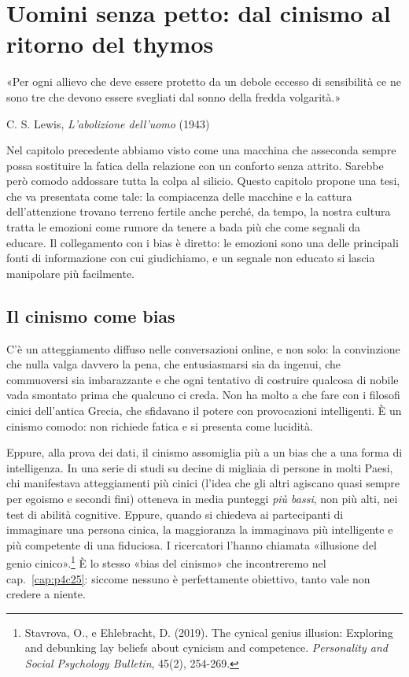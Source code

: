 
\chapter{Uomini senza petto: dal cinismo al ritorno del thymos}
\label{cap:p3c24}

\epigraph{«Per ogni allievo che deve essere protetto da un debole eccesso di sensibilità ce ne sono tre che devono essere svegliati dal sonno della fredda volgarità.»}{C. S. Lewis, \textit{L'abolizione dell'uomo} (1943)}

Nel capitolo precedente abbiamo visto come una macchina che asseconda sempre possa sostituire la fatica della relazione con un conforto senza attrito. Sarebbe però comodo addossare tutta la colpa al silicio. Questo capitolo propone una tesi, che va presentata come tale: la compiacenza delle macchine e la cattura dell'attenzione trovano terreno fertile anche perché, da tempo, la nostra cultura tratta le emozioni come rumore da tenere a bada più che come segnali da educare. Il collegamento con i bias è diretto: le emozioni sono una delle principali fonti di informazione con cui giudichiamo, e un segnale non educato si lascia manipolare più facilmente.

\section{Il cinismo come bias}

C'è un atteggiamento diffuso nelle conversazioni online, e non solo: la convinzione che nulla valga davvero la pena, che entusiasmarsi sia da ingenui, che commuoversi sia imbarazzante e che ogni tentativo di costruire qualcosa di nobile vada smontato prima che qualcuno ci creda. Non ha molto a che fare con i filosofi cinici dell'antica Grecia, che sfidavano il potere con provocazioni intelligenti. È un cinismo comodo: non richiede fatica e si presenta come lucidità.

Eppure, alla prova dei dati, il cinismo assomiglia più a un bias che a una forma di intelligenza. In una serie di studi su decine di migliaia di persone in molti Paesi, chi manifestava atteggiamenti più cinici (l'idea che gli altri agiscano quasi sempre per egoismo e secondi fini) otteneva in media punteggi \textit{più bassi}, non più alti, nei test di abilità cognitive. Eppure, quando si chiedeva ai partecipanti di immaginare una persona cinica, la maggioranza la immaginava più intelligente e più competente di una fiduciosa. I ricercatori l'hanno chiamata «illusione del genio cinico».\footnote{Stavrova, O., e Ehlebracht, D. (2019). The cynical genius illusion: Exploring and debunking lay beliefs about cynicism and competence. \textit{Personality and Social Psychology Bulletin}, 45(2), 254-269.} È lo stesso «bias del cinismo» che incontreremo nel cap.~\ref{cap:p4c25}: siccome nessuno è perfettamente obiettivo, tanto vale non credere a niente.

